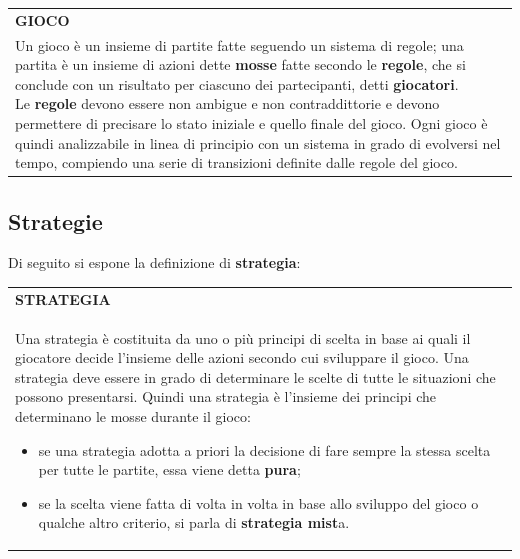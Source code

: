 \documentclass[a4paper]{extarticle}
\renewcommand\arraystretch{}
\begin{document}
\vspace{1em}
\setlength{\tabcolsep}{14pt}
\renewcommand{\arraystretch}{2}
\noindent
\begin{tabularx}{\textwidth}{@{}|P|@{}}
    \hline
    {\textbf{GIOCO}}\\
    \parbox{\linewidth}{Un gioco è un insieme di partite fatte seguendo un sistema di regole; una partita è un insieme di azioni dette \textbf{mosse} fatte secondo le \textbf{regole}, che si conclude con un risultato per ciascuno dei partecipanti, detti \textbf{giocatori}.\\
    Le \textbf{regole} devono essere non ambigue e non contraddittorie e devono permettere di precisare lo stato iniziale e quello finale del gioco. Ogni gioco è quindi analizzabile in linea di principio con un sistema in grado di evolversi nel tempo, compiendo una serie di transizioni definite dalle regole del gioco.
    \vspace{3mm}}\\
    \hline
\end{tabularx}

\vspace{1em}
\subsection{Strategie}
Di seguito si espone la definizione di \textbf{strategia}:

\vspace{1em}
\setlength{\tabcolsep}{14pt}
\renewcommand{\arraystretch}{2}
\noindent
\begin{tabularx}{\textwidth}{@{}|P|@{}}
    \hline
    {\textbf{STRATEGIA}}\\
    \parbox{\linewidth}{Una strategia è costituita da uno o più principi di scelta in base ai quali il giocatore decide l'insieme delle azioni secondo cui sviluppare il gioco.\\
    Una strategia deve essere in grado di determinare le scelte di tutte le situazioni che possono presentarsi. Quindi una strategia è l'insieme dei principi che determinano le mosse durante il gioco:
    \begin{itemize}
        \item se una strategia adotta a priori la decisione di fare sempre la stessa scelta per tutte le partite, essa viene detta \textbf{pura};
        \item se la scelta viene fatta di volta in volta in base allo sviluppo del gioco o qualche altro criterio, si parla di \textbf{strategia mist}a.
    \end{itemize}
    \vspace{1mm}}\\
    \hline
\end{tabularx}
\end{document}
